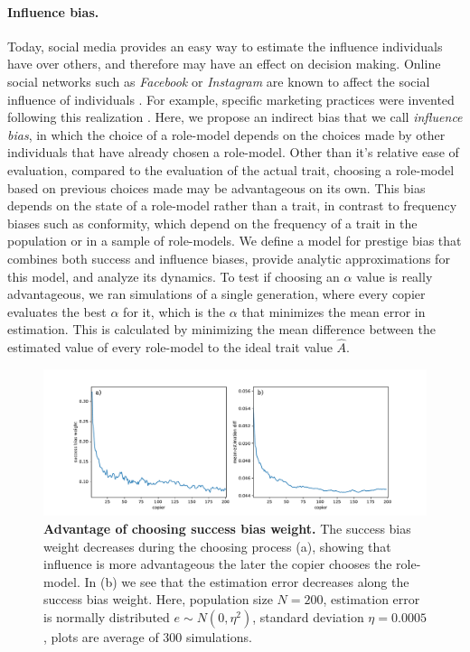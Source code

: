 \documentclass[12pt]{extarticle}
\begin{document}
\paragraph{Influence bias.}
Today, social media provides an easy way to estimate the influence individuals have over others, and therefore may have an effect on decision making. Online social networks such as \textit{Facebook} or \textit{Instagram} are known to affect the social influence of individuals \citep{social_influence,influence_analysis,social_media}. For example, specific marketing practices were invented following this realization \citep{facebook_marketing}.
Here, we propose an indirect bias that we call \textit{influence bias}, in which the choice of a role-model depends on the choices made by other individuals that have already chosen a role-model. 
Other than it's relative ease of evaluation, compared to the evaluation of the actual trait, choosing a role-model based on previous choices made may be advantageous on its own.
This bias depends on the state of a role-model rather than a trait, in contrast to frequency biases such as conformity, which depend on the frequency of a trait in the population or in a sample of role-models. 
We define a model for prestige bias that combines both success and influence biases, provide analytic approximations for this model, and analyze its dynamics.
To test if choosing an $\alpha$ value is really advantageous, we ran simulations of a single generation, where every copier evaluates the best $\alpha$ for it, which is the $\alpha$ that minimizes the mean error in estimation. This is calculated by minimizing the mean difference between the estimated value of every role-model to the ideal trait value $\hat{A}$.

\begin{figure}[h]
    \includegraphics[width=\linewidth]{../figures/influence_advantage/choose_bias.pdf}
  \caption{
  \textbf{Advantage of choosing success bias weight.}
  The success bias weight decreases during the choosing process (a), showing that influence is more advantageous the later the copier chooses the role-model. In (b) we see that the estimation error decreases along the success bias weight.
  Here, population size $N=200$, estimation error is normally distributed $e \sim N(0,\eta^2)$, standard deviation $\eta=0.0005$, plots are average of $300$ simulations.}	
  \label{fig:influence_advantage}
\end{figure}
\end{document}
